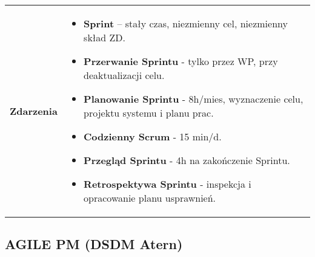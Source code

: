 \documentclass[a4paper]{article}
\begin{document}
\begin{table}[H]
\begin{center}
\begin{tabular}{ p{2.5cm} p{13.5cm}}
                \textbf{Zdarzenia}
                &
                \begin{itemize}
                    \item \textbf{Sprint} – stały czas, niezmienny cel, niezmienny skład ZD.
                    \item \textbf{Przerwanie Sprintu} - tylko przez WP, przy deaktualizacji celu.
                    \item \textbf{Planowanie Sprintu} - 8h/mies, wyznaczenie celu, projektu systemu i planu prac.
                    \item \textbf{Codzienny Scrum} - 15 min/d.
                    \item \textbf{Przegląd Sprintu} - 4h na zakończenie Sprintu.
                    \item \textbf{Retrospektywa Sprintu} - inspekcja i opracowanie planu usprawnień.
                \end{itemize}
            \end{tabular}
        \end{center}
    \end{table}

    \subsection{AGILE PM (DSDM Atern)}
\end{document}

